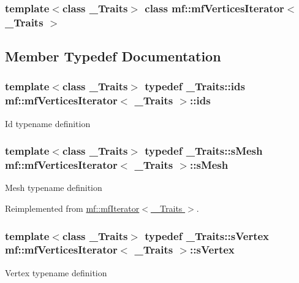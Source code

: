 \subsubsection*{template$<$class \_\-Traits$>$ class mf::mfVerticesIterator$<$ \_\-Traits $>$}



\subsection{Member Typedef Documentation}
\hypertarget{classmf_1_1mfVerticesIterator_a4d1c60d2572a77d4d5080b78c12a85f9}{
\subsubsection[{ids}]{\setlength{\rightskip}{0pt plus 5cm}template$<$class \_\-Traits$>$ typedef \_\-Traits::ids {\bf mf::mfVerticesIterator}$<$ \_\-Traits $>$::{\bf ids}}}
\label{classmf_1_1mfVerticesIterator_a4d1c60d2572a77d4d5080b78c12a85f9}
Id typename definition \hypertarget{classmf_1_1mfVerticesIterator_a351a7fef8c19f4cb57f4c0a68d337679}{
\subsubsection[{sMesh}]{\setlength{\rightskip}{0pt plus 5cm}template$<$class \_\-Traits$>$ typedef \_\-Traits::sMesh {\bf mf::mfVerticesIterator}$<$ \_\-Traits $>$::{\bf sMesh}}}
\label{classmf_1_1mfVerticesIterator_a351a7fef8c19f4cb57f4c0a68d337679}
Mesh typename definition 

Reimplemented from \hyperlink{classmf_1_1mfIterator_aca31e4d7e7eca4e3b100530d8725064b}{mf::mfIterator$<$ \_\-Traits $>$}.

\hypertarget{classmf_1_1mfVerticesIterator_a123ec8591eb79091da3c80bd1a3e2eca}{
\subsubsection[{sVertex}]{\setlength{\rightskip}{0pt plus 5cm}template$<$class \_\-Traits$>$ typedef \_\-Traits::sVertex {\bf mf::mfVerticesIterator}$<$ \_\-Traits $>$::{\bf sVertex}}}
\label{classmf_1_1mfVerticesIterator_a123ec8591eb79091da3c80bd1a3e2eca}
Vertex typename definition 

